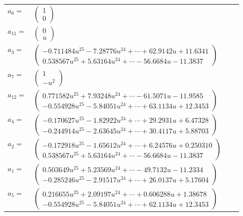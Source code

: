 \documentclass[1p]{elsarticle_modified}
\theoremstyle{definition}
\begin{document}
\begin{tabular}{m{7pt} m{180pt} m{7pt} m{180pt} }
\flushright $a_{6}=$&$\begin{pmatrix}1\\0\end{pmatrix}$ \\
\flushright $a_{11}=$&$\begin{pmatrix}0\\u\end{pmatrix}$ \\
\flushright $a_{3}=$&$\begin{pmatrix}-0.711484 u^{25}-7.28776 u^{24}+\cdots+62.9142 u+11.6341\\0.538567 u^{25}+5.63164 u^{24}+\cdots-56.6684 u-11.3837\end{pmatrix}$ \\
\flushright $a_{7}=$&$\begin{pmatrix}1\\- u^2\end{pmatrix}$ \\
\flushright $a_{12}=$&$\begin{pmatrix}0.771582 u^{25}+7.93248 u^{24}+\cdots-61.5071 u-11.9585\\-0.554928 u^{25}-5.84051 u^{24}+\cdots+63.1134 u+12.3453\end{pmatrix}$ \\
\flushright $a_{4}=$&$\begin{pmatrix}-0.170627 u^{25}-1.82922 u^{24}+\cdots+29.2931 u+6.47328\\-0.244914 u^{25}-2.63645 u^{24}+\cdots+30.4117 u+5.88703\end{pmatrix}$ \\
\flushright $a_{2}=$&$\begin{pmatrix}-0.172918 u^{25}-1.65612 u^{24}+\cdots+6.24576 u+0.250310\\0.538567 u^{25}+5.63164 u^{24}+\cdots-56.6684 u-11.3837\end{pmatrix}$ \\
\flushright $a_{1}=$&$\begin{pmatrix}0.503649 u^{25}+5.23569 u^{24}+\cdots-49.7132 u-11.2334\\-0.285246 u^{25}-2.91517 u^{24}+\cdots+26.0137 u+5.17604\end{pmatrix}$ \\
\flushright $a_{5}=$&$\begin{pmatrix}0.216655 u^{25}+2.09197 u^{24}+\cdots+0.606288 u+1.38678\\-0.554928 u^{25}-5.84051 u^{24}+\cdots+62.1134 u+12.3453\end{pmatrix}$ \\

\end{tabular}
\end{document}
